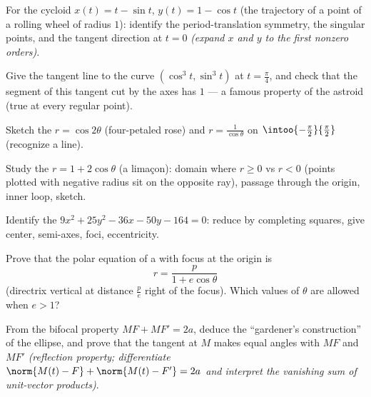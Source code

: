 \begin{exercise}[$\star$]\label{exo:b1:curves:2}
For the cycloid $x(t) = t - \sin t$, $y(t) = 1 - \cos t$ (the
trajectory of a point of a rolling wheel of radius $1$): identify
the period-translation symmetry, the singular points, and the
tangent direction at $t = 0$ \emph{(expand $x$ and $y$ to the first
nonzero orders)}.
\end{exercise}

\begin{exercise}[$\star$]\label{exo:b1:curves:3}
Give the tangent line to the curve $(\cos^3 t, \sin^3 t)$ at $t =
\frac\pi4$, and check that the segment of this tangent cut by the
axes has  $1$ --- a famous property of the astroid (true at
every regular point).
\end{exercise}

\begin{exercise}[$\star$]\label{exo:b1:curves:4}
Sketch the  $r = \cos 2\theta$ (four-petaled rose) and
$r = \frac{1}{\cos\theta}$ on $\intoo{-\frac\pi2}{\frac\pi2}$
(recognize a line).
\end{exercise}

\begin{exercise}[$\star\star$]\label{exo:b1:curves:5}
Study the  $r = 1 + 2\cos\theta$ (a lima\c{c}on): domain
where $r \geq 0$ vs $r < 0$ (points plotted with negative radius
sit on the opposite ray), passage through the origin, inner loop,
sketch.
\end{exercise}

\begin{exercise}[$\star\star$]\label{exo:b1:curves:6}
Identify the  $9x^2 + 25y^2 - 36x - 50y - 164 = 0$: reduce by
completing squares, give center, semi-axes, foci, eccentricity.
\end{exercise}

\begin{exercise}[$\star\star$]\label{exo:b1:curves:7}
Prove that the polar equation of a  with focus at the origin
is
\[
r = \frac{p}{1 + e\cos\theta}
\]
(directrix vertical at distance $\frac pe$ right of the focus).
Which values of $\theta$ are allowed when $e > 1$?
\end{exercise}

\begin{exercise}[$\star\star$]\label{exo:b1:curves:8}
From the bifocal property $MF + MF' = 2a$, deduce the ``gardener's
construction'' of the ellipse, and prove that the tangent at $M$
makes equal angles with $MF$ and $MF'$ \emph{(reflection property;
differentiate $\norm{M(t) - F} + \norm{M(t) - F'} = 2a$ and
interpret the vanishing sum of unit-vector products)}.
\end{exercise}


